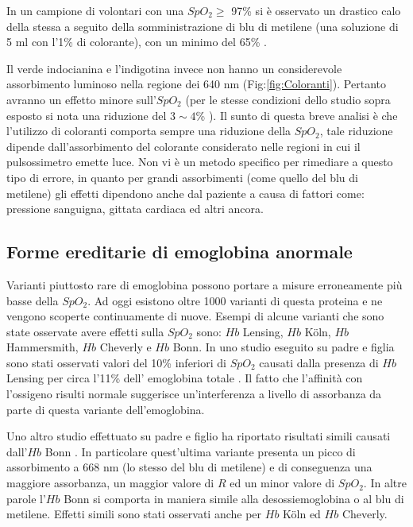 \documentclass[12pt,a4paper, twoside, openright]{report}
\begin{document}
In un campione di volontari con una $SpO_2 \geq$ 97\% si è osservato un drastico calo della stessa a seguito della somministrazione di blu di metilene (una soluzione di 5 ml con l'1\% di colorante), con un minimo del 65\% \cite{Pulseoximeter}. 
\newline

Il verde indocianina e l'indigotina invece non hanno un considerevole assorbimento luminoso nella regione dei 640 nm (Fig:\ref{fig:Coloranti}). 
Pertanto avranno un effetto minore sull'$SpO_2$ (per le stesse condizioni dello studio sopra esposto si nota una riduzione del $3\sim4$\% ). 
Il sunto di questa breve analisi è che l'utilizzo di coloranti comporta sempre una riduzione della $SpO_2$, tale riduzione dipende dall'assorbimento del colorante considerato nelle regioni in cui il pulsossimetro emette luce. 
Non vi è un metodo specifico per rimediare a questo tipo di errore, in quanto per grandi assorbimenti (come quello del blu di metilene) gli effetti dipendono anche dal paziente a causa di fattori come: pressione sanguigna, gittata cardiaca ed altri ancora.


\subsection{Forme ereditarie di emoglobina anormale}

Varianti piuttosto rare di emoglobina possono portare a misure erroneamente più basse della $SpO_2$. 
Ad oggi esistono oltre 1000 varianti di questa proteina e ne vengono scoperte continuamente di nuove. 
Esempi di alcune varianti che sono state osservate avere effetti sulla $SpO_2$ sono: $Hb$ Lensing, $Hb$ K\"oln, $Hb$ Hammersmith, $Hb$ Cheverly e $Hb$ Bonn. 
In uno studio eseguito su padre e figlia sono stati osservati valori del 10\% inferiori di $SpO_2$ causati dalla presenza di $Hb$ Lensing per circa l'11\% dell' emoglobina totale \cite{Pulseoximeter}.%
Il fatto che l'affinità con l'ossigeno risulti normale suggerisce un'interferenza a livello di assorbanza da parte di questa variante dell'emoglobina. 
\newline

Uno altro studio effettuato su padre e figlio ha riportato risultati simili causati dall'$Hb$ Bonn \cite{Pulseoximeter}.%
In particolare quest'ultima variante presenta un picco di assorbimento a 668 nm (lo stesso del blu di metilene) e di conseguenza una maggiore assorbanza, un maggior valore di $R$ ed un minor valore di $SpO_2$. 
In altre parole l'$Hb$ Bonn si comporta in maniera simile alla desossiemoglobina o al blu di metilene. 
Effetti simili sono stati osservati anche per $Hb$ K\"oln ed $Hb$ Cheverly.
\end{document}
